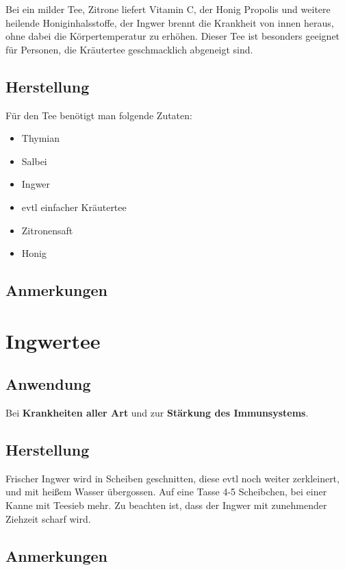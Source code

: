 Bei  ein milder Tee, Zitrone liefert Vitamin C, der Honig Propolis und weitere heilende Honiginhalsstoffe, der Ingwer brennt die Krankheit von innen heraus, ohne dabei die Körpertemperatur zu erhöhen. Dieser Tee ist besonders geeignet für Personen, die Kräutertee geschmacklich abgeneigt sind.

\subsection{Herstellung}

Für den Tee benötigt man folgende Zutaten:

\begin{itemize}
	\item Thymian
	\item Salbei
	\item Ingwer
	\item evtl einfacher Kräutertee
	\item Zitronensaft
	\item Honig
\end{itemize}


\subsection{Anmerkungen}



\section{Ingwertee}

\subsection{Anwendung}

Bei \textbf{Krankheiten aller Art} und zur \textbf{Stärkung des Immunsystems}.

\subsection{Herstellung}

Frischer Ingwer wird in Scheiben geschnitten, diese evtl noch weiter zerkleinert, und mit heißem Wasser übergossen. Auf eine Tasse 4-5 Scheibchen, bei einer Kanne mit Teesieb mehr. Zu beachten ist, dass der Ingwer mit zunehmender Ziehzeit scharf wird.

\subsection{Anmerkungen}

